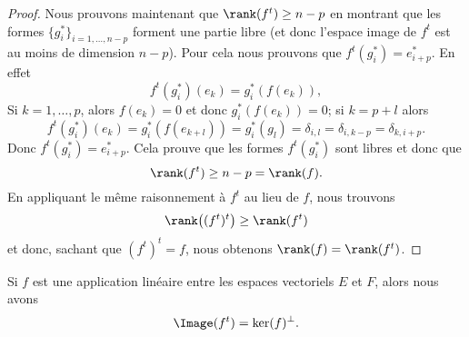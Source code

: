 \begin{proof}
	Nous prouvons maintenant que \( \rank(f^t)\geq n-p\) en montrant que les formes \( \{ g_i^* \}_{i=1,\ldots, n-p}\) forment une partie libre (et donc l'espace image de \( f^t\) est au moins de dimension \( n-p\)). Pour cela nous prouvons que \( f^t(g_i^*)=e^*_{i+p}\). En effet
	\begin{equation}
		f^t(g^*_i)(e_k)=g_i^*(f(e_k)),
	\end{equation}
	Si \( k=1,\ldots, p\), alors \( f(e_k)=0\) et donc \( g_i^*(f(e_k))=0\); si \( k=p+l\) alors
	\begin{equation}
		f^t(g_i^*)(e_k)=g_i^*(f(e_{k+l}))=g^*_i(g_l)=\delta_{i,l}=\delta_{i,k-p}=\delta_{k,i+p}.
	\end{equation}
	Donc \( f^t(g_i^*)=e^*_{i+p}\). Cela prouve que les formes \( f^t(g_i^*)\) sont libres et donc que
	\begin{equation}
		\rank(f^t)\geq n-p=\rank(f).
	\end{equation}
	En appliquant le même raisonnement à \( f^t\) au lieu de \( f\), nous trouvons
	\begin{equation}
		\rank\big( (f^t)^t \big)\geq \rank(f^t)
	\end{equation}
	et donc, sachant que \( (f^t)^t=f\), nous obtenons \( \rank(f)=\rank(f^t)\).

\end{proof}

\begin{proposition}        \label{PropWOPIooBHFDdP}
	Si \( f\) est une application linéaire entre les espaces vectoriels \( E\) et \( F\), alors nous avons
	\begin{equation}
		\Image(f^t)=\ker(f)^{\perp}.
	\end{equation}
\end{proposition}

